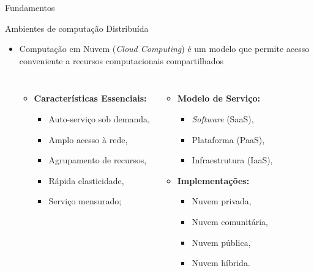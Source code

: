 \documentclass[aspectratio=1610,10pt]{beamer}
\newcommand{\nota}[1]{\hspace*{-0.5cm}\textit{{\color[rgb]{1,0,0}Nota: #1}}}
\begin{document}
\begin{frame}[fragile]{Fundamentos}
\begin{alertblock}{Ambientes de computação Distribuída}
\begin{itemize}
  \item Computação em Nuvem (\emph{Cloud Computing}) é um modelo que permite
  acesso conveniente a recursos computacionais compartilhados \cite{NIST2011}
  \begin{columns}[T,onlytextwidth]
    \begin{itemize}
      \item \textbf{Características Essenciais:}
      \begin{itemize}
        \item Auto-serviço sob demanda,
        \item Amplo acesso à rede,
        \item Agrupamento de recursos,
        \item Rápida elasticidade,
        \item Serviço mensurado;
      \end{itemize}
    \end{itemize}
    \begin{itemize}
      \item \textbf{Modelo de Serviço:}
      \begin{itemize}
        \item \emph{Software} (SaaS),
        \item Plataforma (PaaS),
        \item Infraestrutura (IaaS),
      \end{itemize}
      \item \textbf{Implementações:}
      \begin{itemize}
        \item Nuvem privada,
        \item Nuvem comunitária,
        \item Nuvem pública,
        \item Nuvem híbrida.
      \end{itemize}
    \end{itemize}
  \end{columns}
\end{itemize}
\end{alertblock}
\end{frame}
\end{document}

